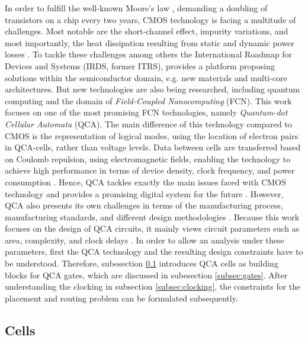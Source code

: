 In order to fulfill the well-known Moore's law \cite{Moores_Law}, demanding a doubling of transistors on a chip every two years, CMOS technology is facing a multitude of challenges. Most notable are the short-channel effect, impurity variations, and most importantly, the heat dissipation resulting from static and dynamic power losses \cite{challenges_1, challenges_2, challenges_3}. To tackle these challenges among others the International Roadmap for Devices and Systems (IRDS, former ITRS), provides a platform proposing solutions within the semiconductor domain, e.g. new materials and multi-core architectures. But new technologies are also being researched, including quantum computing and the domain of \textit{Field-Coupled Nanocomputing} (FCN). This work focuses on one of the most promising FCN technologies, namely \textit{Quantum-dot Cellular Automata} (QCA). The main difference of this technology compared to CMOS is the representation of logical modes, using the location of electron pairs in QCA-cells, rather than voltage levels. Data between cells are transferred based on Coulomb repulsion, using electromagnetic fields, enabling the technology to achieve high performance in terms of device density, clock frequency, and power consumption \cite{mohammadi2016efficient}. Hence, QCA tackles exactly the main issues faced with CMOS technology and provides a promising digital system for the future \cite{ahmad2018optimal}. However, QCA also presents its own challenges in terms of the manufacturing process, manufacturing standards, and different design
methodologies \cite{Bennet_waveform}. Because this work focuses on the design of QCA circuits, it mainly views circuit parameters such as area, complexity, and clock delays \cite{ahmad2018optimal}. In order to allow an analysis under these parameters, first the QCA technology and the resulting design constraints have to be understood. Therefore, subesection \ref{subsec:cells} introduces QCA cells as building blocks for QCA gates, which are discussed in subesection \ref{subsec:gates}. After understanding the clocking in subsection \ref{subsec:clocking}, the constraints for the placement and routing problem can be formulated subsequently.

\subsection{Cells}\label{subsec:cells}

